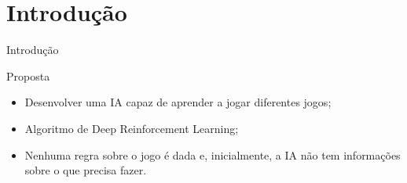 \documentclass[aspectratio=169]{beamer}
\begin{document}
\section{Introdução}
\begin{frame}{Introdução}

\begin{block}{\large{{Proposta}}}
	\begin{itemize}
		\item Desenvolver uma IA capaz de aprender a jogar diferentes jogos;
		\item Algoritmo de Deep Reinforcement Learning;
		\item Nenhuma regra sobre o jogo é dada e, inicialmente, a IA não tem informações sobre o que precisa fazer.
	\end{itemize}
\end{block}


\end{frame}
\end{document}
